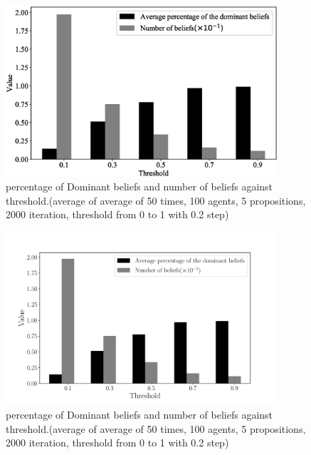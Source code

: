 \documentclass[a4paper,12pt]{article}
\begin{document}
\begin{figure}[H]
	\centering
	\includegraphics[width=0.9\textwidth]{dominant_minhameps}
	\caption{percentage of Dominant beliefs and number of beliefs against threshold.(average of average of 50 times, 100 agents, 5 propositions, 2000 iteration, threshold from 0 to 1 with 0.2 step)}
\end{figure}

\begin{figure}[H]
	\centering
	\includegraphics[width=0.9\textwidth]{figureserif}
	\caption{percentage of Dominant beliefs and number of beliefs against threshold.(average of average of 50 times, 100 agents, 5 propositions, 2000 iteration, threshold from 0 to 1 with 0.2 step)}
\end{figure}
\end{document}
